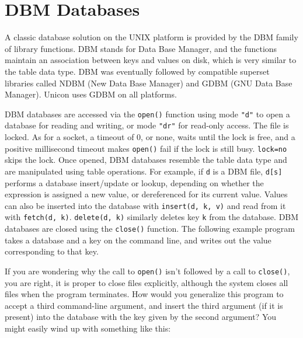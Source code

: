 \section{DBM Databases}

A classic database solution on the UNIX platform is provided by the DBM
family of library functions. DBM stands for Data Base
Manager, and the functions maintain an association between keys and
values on disk, which is very similar to the table data type. DBM was
eventually followed by compatible superset libraries called NDBM (New
Data Base Manager) and GDBM (GNU Data Base Manager). Unicon uses GDBM
on all platforms.

DBM databases are accessed via the \texttt{open()} function using mode
\texttt{"d"} to open a database for reading and writing, or mode
\texttt{"dr"} for read-only access. The file is locked. As for a
socket, a timeout of 0, or none, waits until the lock is free, and a
positive millisecond timeout makes \texttt{open()} fail if the lock
is still busy. \texttt{lock=no} skips the lock. Once opened, DBM databases
resemble the table data type and are manipulated using table
operations. For example, if \texttt{d} is a DBM file,
\texttt{d[s]} performs a database
insert/update or lookup, depending on whether the expression is
assigned a new value, or dereferenced for its
current value. Values can also be
inserted into the database with \texttt{insert(d, k, v)} and read from it with
\texttt{fetch(d, k)}. \texttt{delete(d, k)} similarly deletes key \texttt{k} from
the database. DBM databases are closed using the \texttt{close()}
function. The following example program takes a database and a key on
the command line, and writes out the value corresponding to that key.


If you are wondering why the call to \texttt{open()}
isn't followed by a call to \texttt{close()}, you are
right, it is proper to close files explicitly, although the system
closes all files when the program terminates. How would you generalize
this program to accept a third command-line argument, and insert the
third argument (if it is present) into the database with the key given
by the second argument? You might easily wind up with something like
this:


